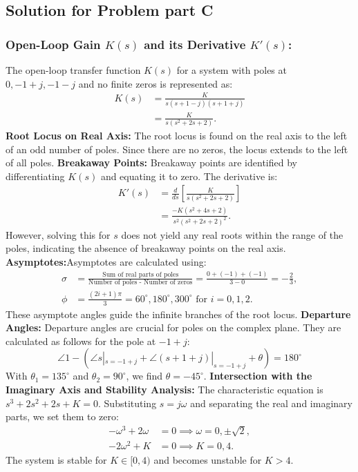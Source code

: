 \documentclass[11pt]{article}
\begin{document}
\newpage
\subsection*{Solution for Problem part C}

\subsubsection*{Open-Loop Gain \( K(s) \) and its Derivative \( K'(s) \):}
The open-loop transfer function \( K(s) \) for a system with poles at \( 0, -1+j, -1-j \) and no finite zeros is represented as:
\begin{align*}
    K(s) &= \frac{K}{s(s+1-j)(s+1+j)} \\
         &= \frac{K}{s(s^2+2s+2)}.
\end{align*}
\newline
\textbf{Root Locus on Real Axis:} The root locus is found on the real axis to the left of an odd number of poles. Since there are no zeros, the locus extends to the left of all poles.
\newline
\textbf{Breakaway Points:} Breakaway points are identified by differentiating \( K(s) \) and equating it to zero. The derivative is:
\begin{align*}
    K'(s) &= \frac{d}{ds}\left[\frac{K}{s(s^2+2s+2)}\right] \\
          &= \frac{-K(s^2+4s+2)}{s^2(s^2+2s+2)^2}.
\end{align*}
However, solving this for \( s \) does not yield any real roots within the range of the poles, indicating the absence of breakaway points on the real axis.
\newline
\textbf{Asymptotes:}Asymptotes are calculated using:
\begin{align*}
    \sigma &= \frac{\text{Sum of real parts of poles}}{\text{Number of poles - Number of zeros}} = \frac{0+(-1)+(-1)}{3-0} = -\frac{2}{3}, \\
    \phi &= \frac{(2i+1)\pi}{3} = 60^\circ, 180^\circ, 300^\circ \text{ for } i=0,1,2.
\end{align*}
These asymptote angles guide the infinite branches of the root locus.
\newline
\textbf{Departure Angles:} Departure angles are crucial for poles on the complex plane. They are calculated as follows for the pole at \( -1+j \):
\[\angle 1 - (\angle s|_{s=-1+j} + \angle(s+1+j)|_{s=-1+j} + \theta) = 180^\circ\]
With \(\theta_1 = 135^\circ\) and \(\theta_2 = 90^\circ\), we find \(\theta = -45^\circ\).
\newline
\textbf{Intersection with the Imaginary Axis and Stability Analysis:}
The characteristic equation is \( s^3 + 2s^2 + 2s + K = 0 \). Substituting \( s = j\omega \) and separating the real and imaginary parts, we set them to zero:
\begin{align*}
    -\omega^3 + 2\omega &= 0 \implies \omega = 0, \pm \sqrt{2}, \\
    -2\omega^2 + K &= 0 \implies K = 0, 4.
\end{align*}
The system is stable for \( K \in [0, 4) \) and becomes unstable for \( K > 4 \).
\end{document}
